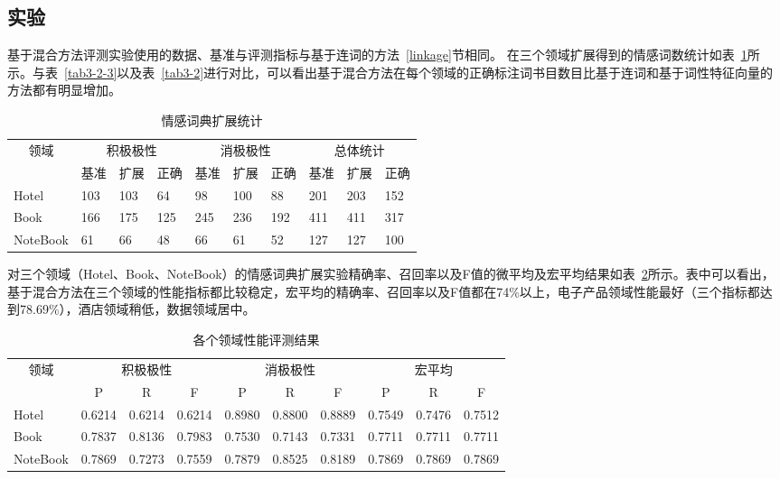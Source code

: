 \subsection{实验}
基于混合方法评测实验使用的数据、基准与评测指标与基于连词的方法~\ref{linkage}节相同。
在三个领域扩展得到的情感词数统计如表~\ref{tab3-3}所示。与表~\ref{tab3-2-3}以及表~\ref{tab3-2}进行对比，可以看出基于混合方法在每个领域的正确标注词书目数目比基于连词和基于词性特征向量的方法都有明显增加。
\begin{table}[htp]
\centering
\caption{情感词典扩展统计}
\label{tab3-3}
\begin{tabular}{|l|l|l|l|l|l|l|l|l|l|}
\hline
\multicolumn{1}{|c|}{\multirow{2}{*}{领域}} & \multicolumn{3}{c|}{积极极性} & \multicolumn{3}{c|}{消极极性} & \multicolumn{3}{c|}{总体统计} \\ \cline{2-10} 
\multicolumn{1}{|c|}{} & \multicolumn{1}{c|}{基准} & \multicolumn{1}{c|}{扩展} & \multicolumn{1}{c|}{正确} & \multicolumn{1}{c|}{基准} & \multicolumn{1}{c|}{扩展} & \multicolumn{1}{c|}{正确} & \multicolumn{1}{c|}{基准} & \multicolumn{1}{c|}{扩展} & \multicolumn{1}{c|}{正确} \\ \hline
Hotel & 103 & 103 & 64 & 98 & 100 & 88 & 201 & 203 & 152 \\ \hline
Book & 166 & 175 & 125 & 245 & 236 & 192 & 411 & 411 & 317 \\ \hline
NoteBook & 61 & 66 & 48 & 66 & 61 & 52 & 127 & 127 & 100 \\ \hline
\end{tabular}
\end{table}

对三个领域（Hotel、Book、NoteBook）的情感词典扩展实验精确率、召回率以及F值的微平均及宏平均结果如表~\ref{tab3-4}所示。表中可以看出，基于混合方法在三个领域的性能指标都比较稳定，宏平均的精确率、召回率以及F值都在74\%以上，电子产品领域性能最好（三个指标都达到78.69\%），酒店领域稍低，数据领域居中。
\begin{table}[htp]
\centering
\caption{各个领域性能评测结果}
\label{tab3-4}
\begin{tabular}{|l|l|l|l|l|l|l|l|l|l|}
\hline
\multicolumn{1}{|c|}{\multirow{2}{*}{领域}} & \multicolumn{3}{c|}{积极极性} & \multicolumn{3}{c|}{消极极性} & \multicolumn{3}{c|}{宏平均} \\ \cline{2-10} 
\multicolumn{1}{|c|}{} & \multicolumn{1}{c|}{P} & \multicolumn{1}{c|}{R} & \multicolumn{1}{c|}{F} & \multicolumn{1}{c|}{P} & \multicolumn{1}{c|}{R} & \multicolumn{1}{c|}{F} & \multicolumn{1}{c|}{P} & \multicolumn{1}{c|}{R} & \multicolumn{1}{c|}{F} \\ \hline
Hotel & 0.6214 & 0.6214 & 0.6214 & 0.8980 & 0.8800 & 0.8889 & 0.7549 & 0.7476 & 0.7512 \\ \hline
Book & 0.7837 & 0.8136 & 0.7983 & 0.7530 & 0.7143 & 0.7331 & 0.7711 & 0.7711 & 0.7711 \\ \hline
NoteBook & 0.7869 & 0.7273 & 0.7559 & 0.7879 & 0.8525 & 0.8189 & 0.7869 & 0.7869 & 0.7869 \\ \hline
\end{tabular}
\end{table}


